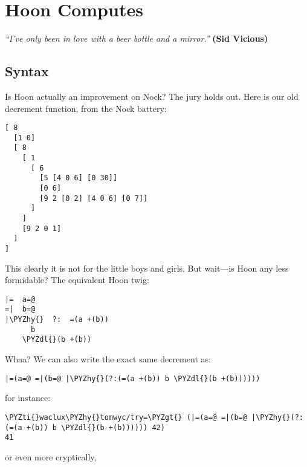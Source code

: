 \chapter{Hoon Computes}

\emph{``I've only been in love with a beer bottle and a mirror.''}
\textbf{(Sid Vicious)}

\section{Syntax}

Is Hoon actually an improvement on Nock?  The jury holds out.
Here is our old decrement function, from the Nock battery:

\begin{framed_shaded}
\begin{Verbatim}[fontsize=\relsize{-2.5},fontseries=b,commandchars=\\\{\}]
[ 8
  [1 0]
  [ 8
    [ 1
      [ 6
        [5 [4 0 6] [0 30]]
        [0 6]
        [9 2 [0 2] [4 0 6] [0 7]]
      ]
    ]
    [9 2 0 1]
  ]
]
\end{Verbatim}
\end{framed_shaded}
This clearly it is not for the little boys and girls.  But wait---is Hoon any less formidable?  The equivalent Hoon twig:

\begin{framed_shaded}
\begin{Verbatim}[fontsize=\relsize{-2.5},fontseries=b,commandchars=\\\{\}]
|=  a=@
=|  b=@
|\PYZhy{}  ?:  =(a +(b))
      b
    \PYZdl{}(b +(b))
\end{Verbatim}
\end{framed_shaded}
Whaa?  We can also write the exact same decrement as:

\begin{framed_shaded}
\begin{Verbatim}[fontsize=\relsize{-2.5},fontseries=b,commandchars=\\\{\}]
|=(a=@ =|(b=@ |\PYZhy{}(?:(=(a +(b)) b \PYZdl{}(b +(b))))))
\end{Verbatim}
\end{framed_shaded}
for instance:

\begin{framed_shaded}
\begin{Verbatim}[fontsize=\relsize{-2.5},fontseries=b,commandchars=\\\{\}]
\PYZti{}waclux\PYZhy{}tomwyc/try=\PYZgt{} (|=(a=@ =|(b=@ |\PYZhy{}(?:(=(a +(b)) b \PYZdl{}(b +(b)))))) 42)
41
\end{Verbatim}
\end{framed_shaded}
or even more cryptically, 

